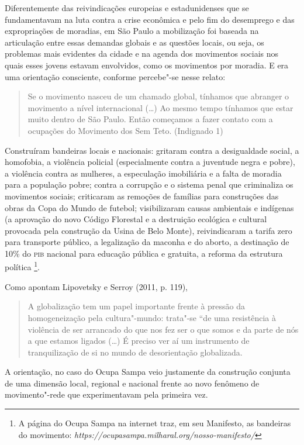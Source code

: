 Diferentemente das reivindicações europeias e estadunidenses que se
fundamentavam na luta contra a crise econômica e pelo fim do desemprego
e das expropriações de moradias, em São Paulo a mobilização foi baseada
na articulação entre essas demandas globais e as questões locais, ou
seja, os problemas mais evidentes da cidade e na agenda dos movimentos
sociais nos quais esses jovens estavam envolvidos, como os movimentos
por moradia. E era uma orientação consciente, conforme percebe"-se nesse
relato:

\begin{quote}
Se o movimento nasceu de um chamado global, tínhamos que abranger o
movimento a nível internacional (\ldots{}) Ao mesmo tempo tínhamos que estar
muito dentro de São Paulo. Então começamos a fazer contato com a
ocupações do Movimento dos Sem Teto. (Indignado 1)
\end{quote}

Construíram bandeiras locais e nacionais: gritaram contra a desigualdade
social, a homofobia, a violência policial (especialmente contra a
juventude negra e pobre), a violência contra as mulheres, a especulação
imobiliária e a falta de moradia para a população pobre; contra a
corrupção e o sistema penal que criminaliza os movimentos sociais;
criticaram as remoções de famílias para construções das obras da Copa do
Mundo de futebol; visibilizaram causas ambientais e indígenas (a
aprovação do novo Código Florestal e a destruição ecológica e cultural
provocada pela construção da Usina de Belo Monte), reivindicaram a
tarifa zero para transporte público, a legalização da maconha e do
aborto, a destinação de 10\% do \textsc{pib} nacional para educação pública e
gratuita, a reforma da estrutura política \footnote{A página do Ocupa
  Sampa na internet traz, em seu Manifesto, as bandeiras do movimento:
  \emph{https://ocupasampa.milharal.org/nosso-manifesto/}}.

Como apontam Lipovetsky e Serroy (2011, p. 119),

\begin{quote}
A globalização tem um papel importante frente à pressão da
homogeneização pela cultura"-mundo: trata"-se ``de uma resistência à
violência de ser arrancado do que nos fez ser o que somos e da parte de
nós a que estamos ligados (\ldots{}) É preciso ver aí um instrumento de
tranquilização de si no mundo de desorientação globalizada.
\end{quote}

A orientação, no caso do Ocupa Sampa veio justamente da construção
conjunta de uma dimensão local, regional e nacional frente ao novo
fenômeno de movimento"-rede que experimentavam pela primeira vez.

